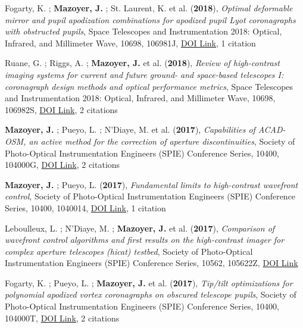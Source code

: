 \documentclass[11pt, a4paper, french]{article}
\begin{document}
\begin{etaremune} \itemsep 0pt

\item Fogarty, K. ; {\bf Mazoyer, J.} ; St. Laurent, K. et al. ({\bf2018}), {\it Optimal deformable mirror and pupil apodization combinations for apodized pupil Lyot coronagraphs with obstructed pupils}, Space Telescopes and Instrumentation 2018: Optical, Infrared, and Millimeter Wave, 10698, 106981J, \href{https://doi.org/10.1117/12.2314394}{DOI Link}, 1 citation

 \item Ruane, G. ; Riggs, A. ; {\bf Mazoyer, J.} et al. ({\bf2018}), {\it Review of high-contrast imaging systems for current and future ground- and space-based telescopes I: coronagraph design methods and optical performance metrics}, Space Telescopes and Instrumentation 2018: Optical, Infrared, and Millimeter Wave, 10698, 106982S, \href{https://doi.org/10.1117/12.2312948}{DOI Link}, 2 citations

 \item {\bf Mazoyer, J.} ; Pueyo, L. ; N'Diaye, M. et al. ({\bf2017}), {\it Capabilities of ACAD-OSM, an active method for the correction of aperture discontinuities}, Society of Photo-Optical Instrumentation Engineers (SPIE) Conference Series, 10400, 104000G, \href{https://doi.org/10.1117/12.2273070}{DOI Link}, 2 citations

 \item {\bf Mazoyer, J.} ; Pueyo, L. ({\bf2017}), {\it Fundamental limits to high-contrast wavefront control}, Society of Photo-Optical Instrumentation Engineers (SPIE) Conference Series, 10400, 1040014, \href{https://doi.org/10.1117/12.2274657}{DOI Link}, 1 citation

 \item Leboulleux, L. ; N'Diaye, M. ; {\bf Mazoyer, J.} et al. ({\bf2017}), {\it Comparison of wavefront control algorithms and first results on the high-contrast imager for complex aperture telescopes (hicat) testbed}, Society of Photo-Optical Instrumentation Engineers (SPIE) Conference Series, 10562, 105622Z, \href{https://doi.org/10.1117/12.2296154}{DOI Link}

 \item Fogarty, K. ; Pueyo, L. ; {\bf Mazoyer, J.} et al. ({\bf2017}), {\it Tip/tilt optimizations for polynomial apodized vortex coronagraphs on obscured telescope pupils}, Society of Photo-Optical Instrumentation Engineers (SPIE) Conference Series, 10400, 104000T, \href{https://doi.org/10.1117/12.2274603}{DOI Link}, 2 citations


\end{etaremune}
\end{document}
